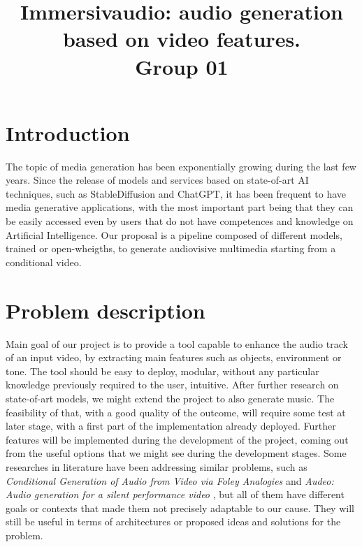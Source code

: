 \documentclass[conference]{IEEEtran}
\begin{document}
\title{Immersivaudio: audio generation based on video features.\\
{\footnotesize Group 01}
}


\author{
\and
{}
\and
{}
}

\maketitle

\section{Introduction}
The topic of media generation has been exponentially growing during the last few years. Since the release of models and services based on state-of-art AI techniques, such as StableDiffusion and ChatGPT, it has been frequent to have media generative applications, with the most important part being that they can be easily accessed even by users that do not have competences and knowledge on Artificial Intelligence. 
Our proposal is a pipeline composed of different models, trained or open-wheigths, to generate audiovisive multimedia starting from a conditional video. 

\section{Problem description}
Main goal of our project is to provide a tool capable to enhance the audio track of an input video, by extracting main features such as objects, environment or tone. The tool should be easy to deploy, modular, without any particular knowledge previously required to the user, intuitive. After further research on state-of-art models, we might extend the project to also generate music. The feasibility of that, with a good quality of the outcome, will require some test at later stage, with a first part of the implementation already deployed. Further features will be implemented during the development of the project, coming out from the useful options that we might see during the development stages. 
Some researches in literature have been addressing similar problems, such as \emph{Conditional Generation of Audio from Video via Foley Analogies} \cite{du2023conditional} and \emph{Audeo: Audio generation for a silent performance video} \cite{su2020audeo}, but all of them have different goals or contexts that made them not precisely adaptable to our cause. They will still be useful in terms of architectures or proposed ideas and solutions for the problem. 
\end{document}
